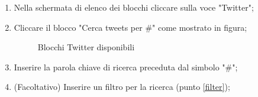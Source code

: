 \begin{enumerate}
	\item Nella schermata di elenco dei blocchi cliccare sulla voce "Twitter";
	\item Cliccare il blocco "Cerca tweets per \#" come mostrato in figura;
	\begin{figure}[!ht]
		\centering
		\caption{Blocchi Twitter disponibili}
	\end{figure}
	\newpage
	\item Inserire la parola chiave di ricerca preceduta dal simbolo "\#";
	\item (Facoltativo) Inserire un filtro per la ricerca (punto \ref{filter});

\end{enumerate}
